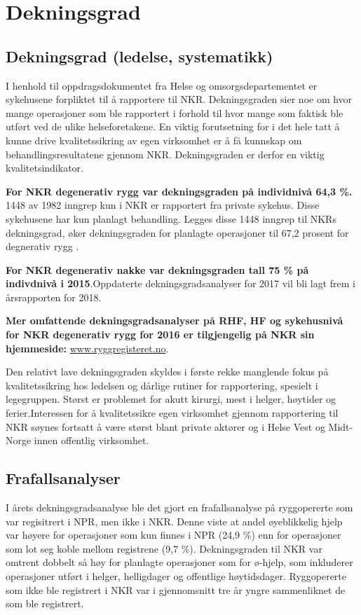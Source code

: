 \documentclass[norsk, a4paper, twocolumn]{report}
\begin{document}
\section{Dekningsgrad}\label{sec:obs}

\subsection{ Dekningsgrad (ledelse, systematikk)}

I henhold til oppdragsdokumentet fra Helse og omsorgsdepartementet er
sykehusene forpliktet til å rapportere til NKR. Dekningsgraden sier noe om hvor
mange operasjoner som ble rapportert i forhold til hvor mange som faktisk ble
utført ved de ulike helseforetakene. En viktig forutsetning for i det hele tatt å kunne
drive kvalitetssikring av egen virksomhet er å få kunnskap om
behandlingsresultatene gjennom NKR. Dekningsgraden er derfor en viktig
kvalitetsindikator.



\textbf{For NKR degenerativ rygg var dekningsgraden på individnivå 64,3 \%. }  1448 av 1982 inngrep kun i NKR er rapportert fra private sykehus. Disse sykehusene har kun planlagt behandling. Legges disse 1448 inngrep til NKRs dekningsgrad, øker dekningsgraden for planlagte operasjoner til 67,2 prosent for degnerativ rygg .

\textbf{For NKR degenerativ nakke var dekningsgraden tall 75 \% på indivdnivå i 2015}.Oppdaterte dekningsgradsanalyser for 2017 vil bli lagt frem i årsrapporten for 2018.



 
\textbf{Mer omfattende dekningsgradsanalyser på RHF, HF og sykehusnivå for NKR degenerativ rygg for 2016 er tilgjengelig på NKR sin hjemmeside:} \url{www.ryggregisteret.no}.


Den relativt lave dekningsgraden skyldes i første rekke manglende fokus på kvalitetssikring hos ledelsen og dårlige rutiner for
rapportering, spesielt i legegruppen. Størst er problemet for akutt kirurgi, mest i
helger, høytider og ferier.Interessen for å kvalitetssikre egen virksomhet gjennom rapportering til NKR søynes fortsatt å være størst blant private aktører og i Helse Vest og Midt-Norge innen offentlig virksomhet. 

\subsection*{Frafallsanalyser}

I årets dekningsgradsanalyse ble det gjort en frafallsanalyse på ryggopererte  som var regisitrert i NPR, men ikke i NKR. Denne viste at andel øyeblikkelig hjelp var høyere for operasjoner som kun finnes i NPR (24,9 \%) enn for operasjoner som lot seg koble mellom registrene (9,7 \%). 
Dekningsgraden til NKR var omtrent dobbelt så høy for planlagte operasjoner som for ø-hjelp, som inkluderer operasjoner utført i helger, helligdager og offentlige høytidsdager. Ryggopererte som ikke ble registrert i NKR var i gjennomsnitt tre år yngre sammenliknet de som ble registrert.
\end{document}
